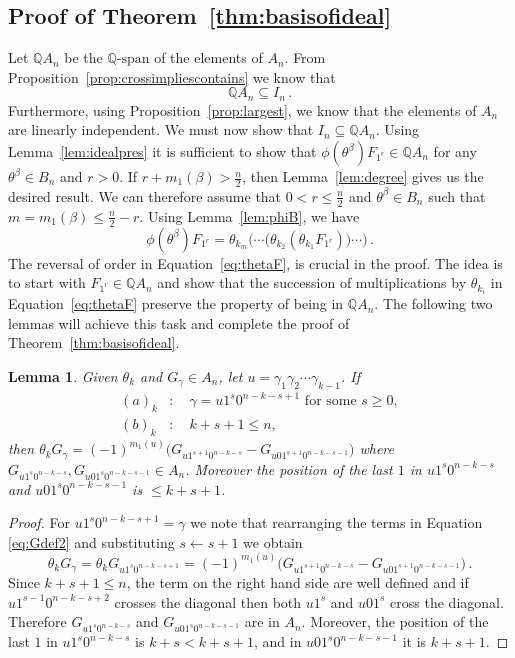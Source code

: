 \documentclass[11pt]{amsart}
\newtheorem{lemma}[theorem]{Lemma}
\theoremstyle{definition}
\numberwithin{equation}{section}
\begin{document}
\subsection{Proof of Theorem~\ref{thm:basisofideal}}\label{ss:proofmainthm}
Let ${\mathbb Q}A_n$ be the ${\mathbb Q}\text{-span}$ of the elements of $A_n$.
From Proposition~\ref{prop:crossimpliescontains} we know that
$${\mathbb Q}A_n \subseteq I_n\,.$$
Furthermore, using Proposition~\ref{prop:largest}, we know that
the elements of $A_n$ are linearly independent.
We must now show that $I_n\subseteq {\mathbb Q}A_n$. Using Lemma~\ref{lem:idealpres} it is sufficient to show that $\phi(\theta^\beta) F_{1^r}\in {\mathbb Q}A_n$ for any $ \theta^\beta \in B_n$ and
$r>0$. If $r+m_1(\beta)>\frac{n}{2}$, then Lemma~\ref{lem:degree} gives us the desired result.
We can therefore assume that $0<r\le \frac{n}{2}$  and $\theta^\beta \in B_n$
such that $m=m_1(\beta)\le \frac{n}{2}-r$.  Using Lemma~\ref{lem:phiB}, we have
\begin{equation}\label{eq:thetaF}
	\phi(\theta^\beta) F_{1^r} =  \theta_{k_m} \Big(\!\!\cdots\!  \big(\theta_{k_2} (\theta_{k_1}F_{1^r})\big)\!\cdots\!\Big)\,.
\end{equation}
The reversal of order in Equation~\eqref{eq:thetaF}, is crucial in the proof.
The idea is to start with $F_{1^r}\in {\mathbb Q}A_n$  and  show that
the succession of multiplications by $\theta_{k_i}$ in Equation~\eqref{eq:thetaF}  preserve the property of being in ${\mathbb Q}A_n$. 
The following two lemmas will achieve this task and complete the proof of Theorem~\ref{thm:basisofideal}.

\begin{lemma}\label{lem:thetaG} 
 Given $\theta_k$ and $G_\gamma\in A_n$, let $u=\gamma_1\gamma_2\cdots\gamma_{k-1}$.  If 
 \begin{align*}
 	(a)_k&:\quad \gamma = u1^{s}0^{n-k-s+1}\text{ for some }s\ge 0,\\
	(b)_k&:\quad k+s+1\le n,
 \end{align*}
 then $\theta_kG_\gamma =(-1)^{m_1(u)}\big( G_{u1^{s+1}0^{n-k-s}} - G_{u01^{s+1}0^{n-k-s-1}} \big)$ where $G_{u1^{s}0^{n-k-s}},G_{u01^{s}0^{n-k-s-1}}\in A_n$. Moreover the
 position of the last $1$ in $u1^{s}0^{n-k-s}$ and $u01^{s}0^{n-k-s-1}$ is $\le k+s+1$. 
\end{lemma}

\begin{proof}
For $u1^{s}0^{n-k-s+1}=\gamma$ we
note that rearranging the terms in Equation \eqref{eq:Gdef2} and substituting $s\leftarrow s+1$ we obtain
\begin{equation}\label{eq:thetaG}
    \theta_k G_\gamma =  \theta_k G_{u1^{s}0^{n-k-s+1}} = (-1)^{m_1(u)}\big( G_{u1^{s+1}0^{n-k-s}} - G_{u01^{s+1}0^{n-k-s-1}} \big)\,.
\end{equation}
Since $k+s+1\le n$, the term on the right hand side  are well defined and 
if $u1^{s-1}0^{n-k-s+2}$ crosses the diagonal then both
$u1^{s}$ and $u01^{s}$ cross the diagonal. Therefore $G_{u1^{s}0^{n-k-s}}$ and $G_{u01^{s}0^{n-k-s-1}}$ are in $A_n$. Moreover, the position of the last $1$ in $u1^{s}0^{n-k-s}$ is $k+s<k+s+1$, and in $u01^{s}0^{n-k-s-1}$ it is $k+s+1$.
\end{proof}
\end{document}
